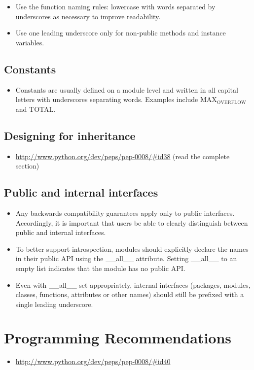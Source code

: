 \documentclass[11pt]{article}
\begin{document}
\begin{itemize}
\item Use the function naming rules: lowercase with words separated by underscores as necessary to improve readability.
\item Use one leading underscore only for non-public methods and instance variables.
\end{itemize}
\subsection{Constants}
\label{sec-4-10}

\begin{itemize}
\item Constants are usually defined on a module level and written in all capital letters with underscores separating words. Examples include MAX$_{\mathrm{OVERFLOW}}$ and TOTAL.
\end{itemize}
\subsection{Designing for inheritance}
\label{sec-4-11}

\begin{itemize}
\item \href{http://www.python.org/dev/peps/pep-0008/#id38}{http://www.python.org/dev/peps/pep-0008/\#id38} (read the complete section)
\end{itemize}
\subsection{Public and internal interfaces}
\label{sec-4-12}

\begin{itemize}
\item Any backwards compatibility guarantees apply only to public interfaces. Accordingly, it is important that users be able to clearly distinguish between public and internal interfaces.
\item To better support introspection, modules should explicitly declare the names in their public API using the \_\_all\_\_ attribute. Setting \_\_all\_\_ to an empty list indicates that the module has no public API.
\item Even with \_\_all\_\_ set appropriately, internal interfaces (packages, modules, classes, functions, attributes or other names) should still be prefixed with a single leading underscore.
\end{itemize}
\section{Programming Recommendations}
\label{sec-5}

\begin{itemize}
\item \href{http://www.python.org/dev/peps/pep-0008/#id40}{http://www.python.org/dev/peps/pep-0008/\#id40}
\end{itemize}
\end{document}
